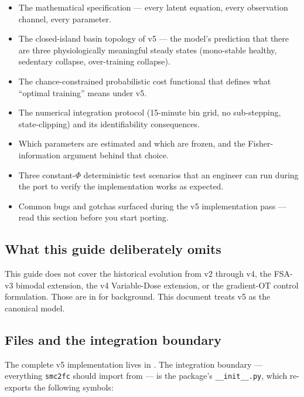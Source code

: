 \documentclass[11pt,a4paper]{article}
\theoremstyle{definition}
\begin{document}
\begin{itemize}
  \item The mathematical specification --- every latent equation,
        every observation channel, every parameter.
  \item The closed-island basin topology of v5 --- the model's
        prediction that there are three physiologically meaningful
        steady states (mono-stable healthy, sedentary collapse,
        over-training collapse).
  \item The chance-constrained probabilistic cost functional that
        defines what ``optimal training'' means under v5.
  \item The numerical integration protocol (15-minute bin grid, no
        sub-stepping, state-clipping) and its identifiability
        consequences.
  \item Which parameters are estimated and which are frozen, and the
        Fisher-information argument behind that choice.
  \item Three constant-$\Phi$ deterministic test scenarios that an
        engineer can run during the port to verify the implementation
        works as expected.
  \item Common bugs and gotchas surfaced during the v5 implementation
        pass --- read this section before you start porting.
\end{itemize}

\subsection{What this guide deliberately omits}

This guide does not cover the historical evolution from v2 through v4,
the FSA-v3 bimodal extension, the v4 Variable-Dose extension, or the
gradient-OT control formulation. Those are in  for
background. This document treats v5 as the canonical model.

\subsection{Files and the integration boundary} \label{sec:files}

The complete v5 implementation lives in
. The integration boundary --- everything
\texttt{smc2fc} should import from --- is the package's
\texttt{\_\_init\_\_.py}, which re-exports the following symbols:
\end{document}
